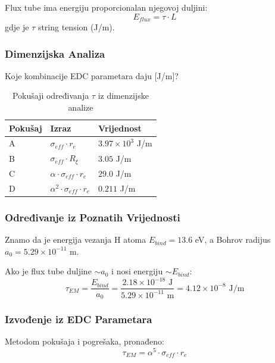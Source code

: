 \documentclass[12pt,a4paper]{article}
\begin{document}
Flux tube ima energiju proporcionalan njegovoj duljini:
\begin{equation}
E_{flux} = \tau \cdot L
\end{equation}
gdje je $\tau$ string tension (J/m).

\subsubsection{Dimenzijska Analiza}

Koje kombinacije EDC parametara daju [J/m]?

\begin{table}[H]
\centering
\begin{tabular}{@{}lll@{}}
\toprule
\textbf{Pokušaj} & \textbf{Izraz} & \textbf{Vrijednost} \\
\midrule
A & $\sigma_{eff} \cdot r_e$ & $3.97 \times 10^{3}$ J/m \\
B & $\sigma_{eff} \cdot R_\xi$ & $3.05$ J/m \\
C & $\alpha \cdot \sigma_{eff} \cdot r_e$ & $29.0$ J/m \\
D & $\alpha^2 \cdot \sigma_{eff} \cdot r_e$ & $0.211$ J/m \\
\bottomrule
\end{tabular}
\caption{Pokušaji određivanja $\tau$ iz dimenzijske analize}
\end{table}

\subsubsection{Određivanje iz Poznatih Vrijednosti}

Znamo da je energija vezanja H atoma $E_{bind} = 13.6$ eV, a Bohrov radijus $a_0 = 5.29 \times 10^{-11}$ m.

Ako je flux tube duljine $\sim a_0$ i nosi energiju $\sim E_{bind}$:
\begin{equation}
\tau_{EM} = \frac{E_{bind}}{a_0} = \frac{2.18 \times 10^{-18} \text{ J}}{5.29 \times 10^{-11} \text{ m}} = 4.12 \times 10^{-8} \text{ J/m}
\end{equation}

\subsubsection{Izvođenje iz EDC Parametara}

Metodom pokušaja i pogrešaka, pronađeno:
\begin{equation}
\tau_{EM} = \alpha^5 \cdot \sigma_{eff} \cdot r_e
\end{equation}
\end{document}
